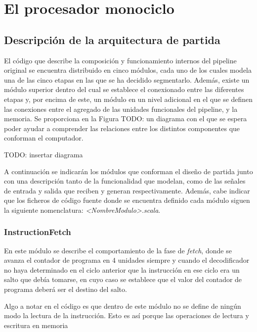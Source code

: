 \chapter{El procesador monociclo}

\section{Descripción de la arquitectura de partida}

El código que describe la composición y funcionamiento internos del pipeline original se encuentra distribuido en cinco módulos, cada uno de los cuales modela una de las cinco etapas en las que se ha decidido segmentarlo. Además, existe un módulo superior dentro del cual se establece el conexionado entre las diferentes etapas y, por encima de este, un módulo en un nivel adicional en el que se definen las conexiones entre el agregado de las unidades funcionales del pipeline, y la memoria. Se proporciona en la Figura TODO: un diagrama con el que se espera poder ayudar a comprender las relaciones entre los distintos componentes que conforman el computador.

TODO: insertar diagrama

A continuación se indicarán los módulos que conforman el diseño de partida junto con una descripción tanto de la funcionalidad que modelan, como de las señales de entrada y salida que reciben y generan respectivamente. Además, cabe indicar que los ficheros de código fuente donde se encuentra definido cada módulo siguen la siguiente nomenclatura: \textit{<NombreModulo>.scala}.

\subsection{InstructionFetch}

En este módulo se describe el comportamiento de la fase de \textit{fetch}, donde se avanza el contador de programa en 4 unidades siempre y cuando el decodificador no haya determinado en el ciclo anterior que la instrucción en ese ciclo era un salto que debía tomarse, en cuyo caso se establece que el valor del contador de programa deberá ser el destino del salto.

Algo a notar en el código es que dentro de este módulo no se define de ningún modo la lectura de la instrucción. Esto es así porque las operaciones de lectura y escritura en memoria 

